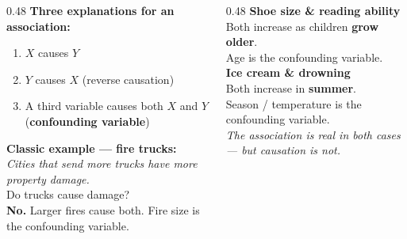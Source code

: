 \documentclass[aspectratio=169, 11pt]{beamer}
\begin{document}
{
\begin{frame}[t, plain]
  \hspace{0.4cm}%
  \begin{minipage}{0.93\textwidth}
    \vspace{0.3cm}
    \begin{columns}[T]

      \begin{column}{0.48\textwidth}
        \small
        \textbf{\color{navy}Three explanations for an association:}
        \begin{enumerate}
          \setlength{\itemsep}{0.4em}
          \item $X$ causes $Y$
          \item $Y$ causes $X$ (reverse causation)
          \item A third variable causes both $X$ and $Y$
                (\textbf{confounding variable})
        \end{enumerate}
        \vspace{8pt}
        \textbf{\color{navy}Classic example --- fire trucks:}\\
        \textit{Cities that send more trucks have more property damage.}\\[4pt]
        Do trucks cause damage?\\
        \textbf{No.} Larger fires cause both.
        Fire size is the confounding variable.
      \end{column}

      \begin{column}{0.48\textwidth}
        \small
        \textbf{\color{navy}Shoe size \& reading ability}\\[4pt]
        Both increase as children \textbf{grow older}.\\
        Age is the confounding variable.\\[8pt]
        \textbf{\color{navy}Ice cream \& drowning}\\[4pt]
        Both increase in \textbf{summer}.\\
        Season / temperature is the confounding variable.\\[8pt]
        \textit{The association is real in both cases ---
        but causation is not.}
      \end{column}

    \end{columns}
  \end{minipage}
\end{frame}
}
\end{document}
